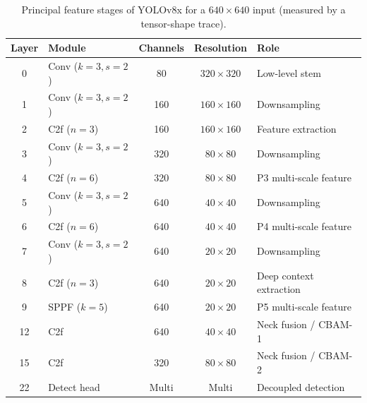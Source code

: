 \begin{table}[!t]
\centering
\caption{Principal feature stages of YOLOv8x for a $640\times640$ input (measured by a tensor-shape trace).}
\label{tab:stages}
\setlength{\tabcolsep}{3pt}
\begin{tabular}{clccl}
\toprule
Layer & Module & Channels & Resolution & Role \\
\midrule
0 & Conv ($k{=}3,s{=}2$) & 80 & $320\times320$ & Low-level stem \\
1 & Conv ($k{=}3,s{=}2$) & 160 & $160\times160$ & Downsampling \\
2 & C2f ($n{=}3$) & 160 & $160\times160$ & Feature extraction \\
3 & Conv ($k{=}3,s{=}2$) & 320 & $80\times80$ & Downsampling \\
4 & C2f ($n{=}6$) & 320 & $80\times80$ & P3 multi-scale feature \\
5 & Conv ($k{=}3,s{=}2$) & 640 & $40\times40$ & Downsampling \\
6 & C2f ($n{=}6$) & 640 & $40\times40$ & P4 multi-scale feature \\
7 & Conv ($k{=}3,s{=}2$) & 640 & $20\times20$ & Downsampling \\
8 & C2f ($n{=}3$) & 640 & $20\times20$ & Deep context extraction \\
9 & SPPF ($k{=}5$) & 640 & $20\times20$ & P5 multi-scale feature \\
12 & C2f & 640 & $40\times40$ & Neck fusion / CBAM-1 \\
15 & C2f & 320 & $80\times80$ & Neck fusion / CBAM-2 \\
22 & Detect head & Multi & Multi & Decoupled detection \\
\bottomrule
\end{tabular}
\end{table}
